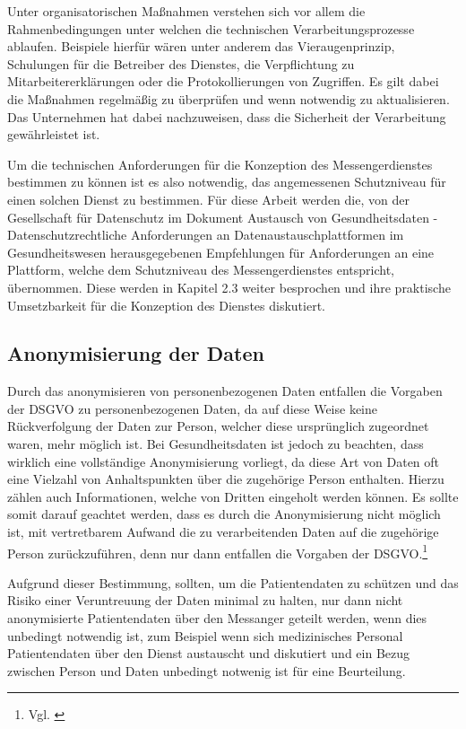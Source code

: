 Unter organisatorischen Maßnahmen verstehen sich vor allem die Rahmenbedingungen unter welchen die technischen Verarbeitungsprozesse ablaufen. Beispiele hierfür wären unter anderem das Vieraugenprinzip, Schulungen für die Betreiber des Dienstes, die Verpflichtung zu Mitarbeitererklärungen oder die Protokollierungen von Zugriffen. Es gilt dabei die Maßnahmen regelmäßig zu überprüfen und wenn notwendig zu aktualisieren. Das Unternehmen hat dabei nachzuweisen, dass die Sicherheit der Verarbeitung gewährleistet ist. 

Um die technischen Anforderungen für die Konzeption des Messengerdienstes bestimmen zu können ist es also notwendig, das angemessenen Schutzniveau für einen solchen Dienst zu bestimmen. Für diese Arbeit werden die, von der Gesellschaft für Datenschutz im Dokument \glqq Austausch von Gesundheitsdaten -  Datenschutzrechtliche Anforderungen an Datenaustauschplattformen im Gesundheitswesen\grqq{} herausgegebenen Empfehlungen für Anforderungen an eine Plattform, welche dem Schutzniveau des Messengerdienstes entspricht, übernommen. Diese werden in Kapitel 2.3 weiter besprochen und ihre praktische Umsetzbarkeit für die Konzeption des Dienstes diskutiert. 


\subsection{Anonymisierung der Daten}\label{subsection:add}
Durch das anonymisieren von personenbezogenen Daten entfallen die Vorgaben der DSGVO zu personenbezogenen Daten, da auf diese Weise keine Rückverfolgung der Daten zur Person, welcher diese ursprünglich zugeordnet waren, mehr möglich ist. Bei Gesundheitsdaten ist jedoch zu beachten, dass wirklich eine vollständige Anonymisierung vorliegt, da diese Art von Daten oft eine Vielzahl von Anhaltspunkten über die zugehörige Person enthalten. Hierzu zählen auch Informationen, welche von Dritten eingeholt werden können. Es sollte somit darauf geachtet werden, dass es durch die Anonymisierung nicht möglich ist, mit vertretbarem Aufwand die zu verarbeitenden Daten auf die zugehörige Person zurückzuführen, denn nur dann entfallen die Vorgaben der DSGVO.\footnote{Vgl. \cite[S. 5 f.]{Bundesaerztekammer2019}}

Aufgrund dieser Bestimmung, sollten, um die Patientendaten zu schützen und das Risiko einer Veruntreuung der Daten minimal zu halten, nur dann nicht anonymisierte Patientendaten über den Messanger geteilt werden, wenn dies unbedingt notwendig ist, zum Beispiel wenn sich medizinisches Personal Patientendaten über den Dienst austauscht und diskutiert und ein Bezug zwischen Person und Daten unbedingt notwenig ist für eine Beurteilung.

